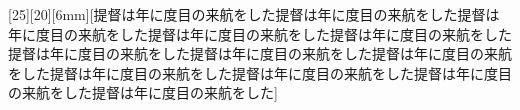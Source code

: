 \documentclass[luatex,fontsize=8pt,paper=b5,twoside,report]{jlreq}%
\begin{document}
[25][20][6mm][提督は年に度目の来航をした提督は年に度目の来航をした提督は年に度目の来航をした提督は年に度目の来航をした提督は年に度目の来航をした提督は年に度目の来航をした提督は年に度目の来航をした提督は年に度目の来航をした提督は年に度目の来航をした提督は年に度目の来航をした提督は年に度目の来航をした提督は年に度目の来航をした]
\end{document}

